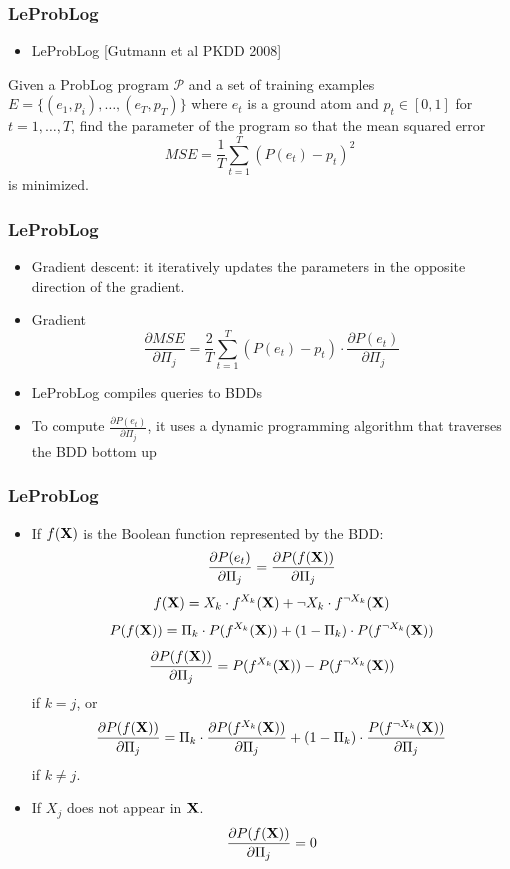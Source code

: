 \documentclass[trans,aspectratio=1610]{beamer}
\newcommand{\defpprog}{\ensuremath{\mathcal{P}}\xspace}
\newcommand{\vecranvar}[1]{%
\ensuremath{\mathbf{\ranvar{#1}}}}
\newcommand{\ranvar}[1]{%
\ensuremath{{#1}}}
\begin{document}
\begin{frame}
 \frametitle{LeProbLog}

\begin{itemize}
\item
LeProbLog [Gutmann et al PKDD 2008]
\end{itemize}
\begin{definition}
Given a ProbLog program \defpprog and
a set of training examples $E=\{(e_1, p_i),\ldots,(e_T,p_T)\}$ where $e_t$ is a ground atom and $p_t\in[0,1]$  for $t=1,\ldots,T$, find the parameter of the program so that the mean
squared error
$$MSE=\frac{1}{T}\sum_{t=1}^T(P(e_t)-p_t)^2$$
is minimized.
\end{definition}
\end{frame}
\begin{frame}
 \frametitle{LeProbLog}

\begin{itemize}
\item Gradient descent: it iteratively updates the
parameters in the opposite direction of the gradient. 
\item Gradient
$$\frac{\partial MSE}{\partial \Pi_j}=\frac{2}{T}\sum_{t=1}^T(P(e_t)-p_t)\cdot\frac{\partial P(e_t)}
{\partial \Pi_j}$$
\item 
LeProbLog compiles queries to BDDs
\item 
To compute $\frac{\partial P(e_t)}{\partial \Pi_j}$, it uses a dynamic programming algorithm that
traverses the BDD bottom up
\end{itemize}
\end{frame}
\begin{frame}
 \frametitle{LeProbLog}
 
\begin{itemize}
\item
If $f(\vecranvar{X})$ is the Boolean function represented by the BDD:
$$\frac{\partial P(e_t)}{\partial \Pi_j}=\frac{\partial P(f(\vecranvar{X}))}{\partial \Pi_j}$$
$$f(\vecranvar{X})=\ranvar{X}_k\cdot f^{\ranvar{X}_k}(\vecranvar{X})+\neg \ranvar{X}_k\cdot f^{\neg \ranvar{X}_k}(\vecranvar{X})$$
$$P(f(\vecranvar{X}))=\Pi_k\cdot P(f^{\ranvar{X}_k}(\vecranvar{X}))+(1-\Pi_k)\cdot P(f^{\neg \ranvar{X}_k}(\vecranvar{X}))$$
$$\frac{\partial P(f(\vecranvar{X}))}{\partial \Pi_j}=P(f^{\ranvar{X}_k}(\vecranvar{X}))- P(f^{\neg \ranvar{X}_k}(\vecranvar{X}))$$
if $k=j$, or
$$\frac{\partial P(f(\vecranvar{X}))}{\partial \Pi_j}=\Pi_k\cdot\frac{\partial P(f^{\ranvar{X}_k}(\vecranvar{X}))}{\partial \Pi_j}+(1-\Pi_k)\cdot\frac{ P(f^{\neg \ranvar{X}_k}(\vecranvar{X}))}{\partial \Pi_j}$$
if $k\neq j$.
\item If $\ranvar{X}_j$ does not appear in $\vecranvar{X}$.
$$\frac{\partial P(f(\vecranvar{X}))}{\partial \Pi_j}=0$$ 
\end{itemize}
\end{frame}
\end{document}
